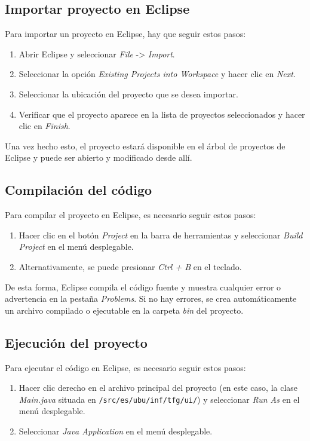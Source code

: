 \subsection{Importar proyecto en Eclipse}
Para importar un proyecto en Eclipse, hay que seguir estos pasos:

\begin{enumerate}
    \item Abrir Eclipse y seleccionar \textit{File} -> \textit{Import}.
    \item Seleccionar la opción \textit{Existing Projects into Workspace} y hacer clic en \textit{Next}.
    \item Seleccionar la ubicación del proyecto que se desea importar.
    \item Verificar que el proyecto aparece en la lista de proyectos seleccionados y hacer clic en \textit{Finish}.
\end{enumerate}

Una vez hecho esto, el proyecto estará disponible en el árbol de proyectos de Eclipse y puede ser abierto y modificado desde allí.

\subsection{Compilación del código}
Para compilar el proyecto en Eclipse, es necesario seguir estos pasos:

\begin{enumerate}
    \item Hacer clic en el botón \textit{Project} en la barra de herramientas y seleccionar \textit{Build Project} en el menú desplegable.
    \item Alternativamente, se puede presionar \textit{Ctrl + B} en el teclado.
\end{enumerate}

De esta forma, Eclipse compila el código fuente y muestra cualquier error o advertencia en la pestaña \textit{Problems}. Si no hay errores, se crea automáticamente un archivo compilado o ejecutable en la carpeta \textit{bin} del proyecto.

\subsection{Ejecución del proyecto}

Para ejecutar el código en Eclipse, es necesario seguir estos pasos:

\begin{enumerate}
    \item Hacer clic derecho en el archivo principal del proyecto (en este caso, la clase \textit{Main.java} situada en \texttt{/src/es/ubu/inf/tfg/ui/}) y seleccionar \textit{Run As} en el menú desplegable.
    \item Seleccionar \textit{Java Application} en el menú desplegable.
\end{enumerate}

